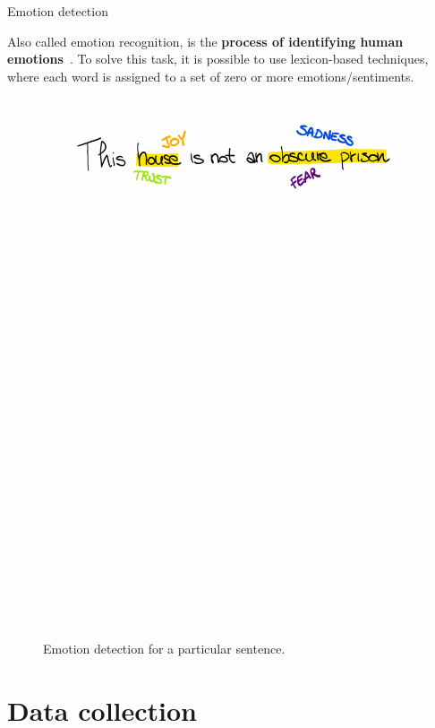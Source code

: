 \documentclass[8pt]{beamer}  %
\begin{document}
\begin{frame}{Emotion detection}

Also called emotion recognition, is the \textbf{process of identifying human emotions}~\autocite{enwiki:1023798177}. To solve this task, it is possible to use lexicon-based techniques, where each word is assigned to a set of zero or more emotions/sentiments.

\begin{figure}[H]
    	\centering
        	\includegraphics[scale=.45,trim= 0 700 0 30, clip]{assets/img/emotion_detection_example.pdf}
        	\caption{Emotion detection for a particular sentence.}
        	\label{fig:emotion-detection-example}
    \end{figure}

\end{frame}

\section{Data collection}
\end{document}
